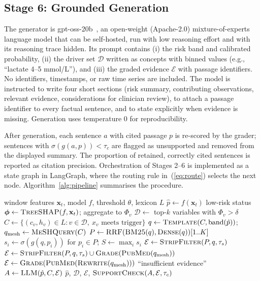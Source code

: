 \documentclass[conference]{IEEEtran}
\begin{document}
\subsection{Stage 6: Grounded Generation}
\label{sec:gen}
The generator is gpt-oss-20b~\cite{openai2025gptoss}, an open-weight
(Apache-2.0) mixture-of-experts language model that can be self-hosted,
run with low reasoning effort and with its reasoning trace hidden. Its
prompt contains (i) the risk band and calibrated probability,
(ii) the driver set $\mathcal{D}$ written as concepts with binned values
(e.g., ``lactate 4--5 mmol/L''), and (iii) the graded evidence $\mathcal{E}$
with passage identifiers. No identifiers, timestamps, or raw time series are
included. The model is instructed to write four short sections (risk
summary, contributing observations, relevant evidence, considerations for
clinician review), to attach a passage identifier to every factual
sentence, and to state explicitly when evidence is missing. Generation uses
temperature 0 for reproducibility.

After generation, each sentence $a$ with cited passage $p$ is re-scored by
the grader; sentences with $\sigma(g(a,p)) < \tau_c$ are flagged as
unsupported and removed from the displayed summary. The proportion of
retained, correctly cited sentences is reported as citation precision.
Orchestration of Stages 2--6 is implemented as a state graph in LangGraph,
where the routing rule in~(\ref{eq:route}) selects the next node.
Algorithm~\ref{alg:pipeline} summarises the procedure.

\begin{algorithm}[!t]
\caption{SHAP-Guided Corrective RAG for One Alert}
\label{alg:pipeline}
\footnotesize
\begin{algorithmic}[1]
\Require window features $\mathbf{x}_t$, model $f$, threshold $\theta$, lexicon $L$
\State $\hat{p} \gets f(\mathbf{x}_t)$
 \State \Return low-risk status \EndIf
\State $\boldsymbol{\phi} \gets \textsc{TreeSHAP}(f, \mathbf{x}_t)$; aggregate to $\Phi_v$
\State $\mathcal{D} \gets$ top-$k$ variables with $\Phi_v > \delta$ 
\State $C \gets \{(c_v, h_v) \in L : v \in \mathcal{D},\ x_v \text{ meets trigger}\}$
\State $q \gets \textsc{Template}(C, \text{band}(\hat{p}))$; $q_{\text{mesh}} \gets \textsc{MeSHQuery}(C)$
\State $P \gets \textsc{RRF}(\textsc{BM25}(q), \textsc{Dense}(q))[1..K]$
\State $s_i \gets \sigma(g(q,p_i))$ for $p_i \in P$; $S \gets \max_i s_i$
 \State $\mathcal{E} \gets \textsc{StripFilter}(P, q, \tau_s)$
 \State $\mathcal{E} \gets \textsc{StripFilter}(P, q, \tau_s) \cup \textsc{Grade}(\textsc{PubMed}(q_{\text{mesh}}))$
\Else \State $\mathcal{E} \gets \textsc{Grade}(\textsc{PubMed}(\textsc{Rewrite}(q_{\text{mesh}})))$
\EndIf
{} \State \Return ``insufficient evidence'' \EndIf
\State $A \gets \textsc{LLM}(\hat{p}, C, \mathcal{E})$
\State \Return $\hat{p}$, $\mathcal{D}$, $\mathcal{E}$, $\textsc{SupportCheck}(A, \mathcal{E}, \tau_c)$
\end{algorithmic}
\end{algorithm}
\end{document}
